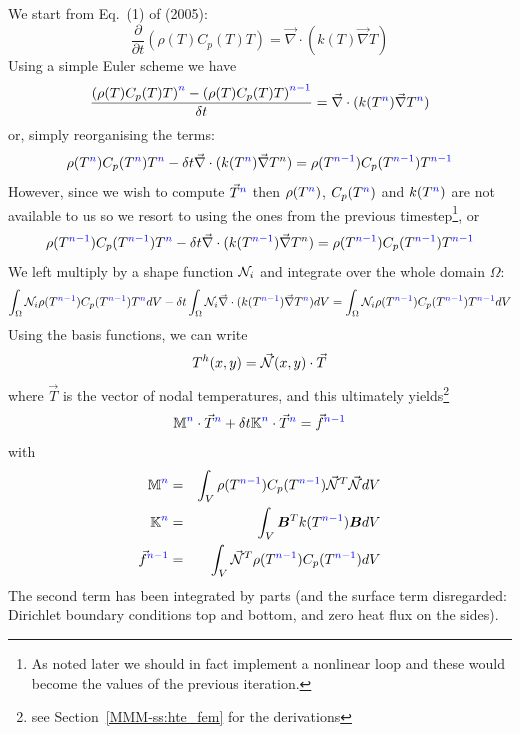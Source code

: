 We start from Eq.~(1) of \textcite{mcjp05} (2005):
\[
\frac{\partial}{\partial t}
\left(\rho(T) C_p(T) T \right) = \vec\nabla \cdot \left(k(T) \vec\nabla T \right)
\]
Using a simple Euler scheme we have
\[
\frac{ \left(\rho(T) C_p(T) T \right)^{\color{blue}n} - \left(\rho(T) C_p(T) T \right)^{\color{blue}n-1} }
{\delta t}   = \vec\nabla \cdot (k(T^{\color{blue}n}) \vec\nabla T^{\color{blue}n})
\]
or, simply reorganising the terms: 
\[
\rho(T^{\color{blue}n}) C_p(T^{\color{blue}n}) T^{{\color{blue}n}} - 
\delta t \vec\nabla \cdot (k(T^{\color{blue}n}) \vec\nabla T^n)
= \rho(T^{\color{blue}n-1}) C_p(T^{\color{blue}n-1}) T^{\color{blue}n-1} 
\]
However, since we wish to compute $\vec{T}^{\color{blue} n}$ then 
$\rho(T^{\color{blue}n})$, $C_p(T^{\color{blue}n})$ and $k(T^{\color{blue}n})$ are
not available to us so we resort to using the ones from the previous timestep\footnote{As noted
later we should in fact implement a nonlinear loop and these would become the values 
of the previous iteration.}, or
\[
\rho(T^{\color{blue}n-1}) C_p(T^{\color{blue}n-1}) T^{{\color{blue}n}} - 
\delta t \vec\nabla \cdot (k(T^{\color{blue}n-1}) \vec\nabla T^n)
= \rho(T^{\color{blue}n-1}) C_p(T^{\color{blue}n-1}) T^{\color{blue}n-1} 
\]
We left multiply by a shape function ${\mathcal{N}}_i$ and integrate over the whole domain $\Omega$:
\[
\int_\Omega {\mathcal{N}}_i \rho(T^{\color{blue}n-1}) C_p(T^{\color{blue}n-1}) T^{{\color{blue}n}} dV-
\delta t \int_\Omega {\mathcal{N}}_i \vec\nabla \cdot (k(T^{\color{blue}n-1}) \vec\nabla T^{\color{blue}n}) dV
= 
\int_\Omega {\mathcal{N}}_i\rho(T^{\color{blue} n-1}) C_p(T^{\color{blue}n-1}) T^{\color{blue} n-1} dV
\]
Using the basis functions, we can write
\[
T^h(x,y) = \vec{{\mathcal{N}}}(x,y) \cdot \vec{T}
\]
where $\vec{T}$ is the vector of nodal temperatures, and this ultimately 
yields\footnote{see Section~\ref{MMM-ss:hte_fem}
for the derivations}
\[
{\bm {{\mathbb{M}}}}^{\color{blue}n} \cdot \vec{T}^{\color{blue}n} 
+ \delta t {\bm {{\mathbb{K}}}}^{\color{blue}n} \cdot \vec{T}^{\color{blue}n} = \vec{f}^{\color{blue} n-1}
\]
with
\begin{eqnarray}
{\bm {{\mathbb{M}}}}^{\color{blue}n} &=& \int_V \rho(T^{\color{blue}n-1}) C_p(T^{\color{blue}n-1}) \vec{{\mathcal{N}}}^T \vec{{\mathcal{N}}} dV  \nonumber\\
{\bm {{\mathbb{K}}}}^{\color{blue}n} &=& \int_V {\bm B}^T k(T^{\color{blue}n-1}) {\bm B} dV \nonumber\\
\vec{f}^{\color{blue} n-1} &=& \int_V \vec{{\mathcal{N}}}^T \rho(T^{\color{blue} n-1}) C_p(T^{\color{blue}n-1}) dV \nonumber
\end{eqnarray}
The second term has been integrated by parts (and the surface term disregarded:
Dirichlet boundary conditions top and bottom, and zero heat flux on the sides).

